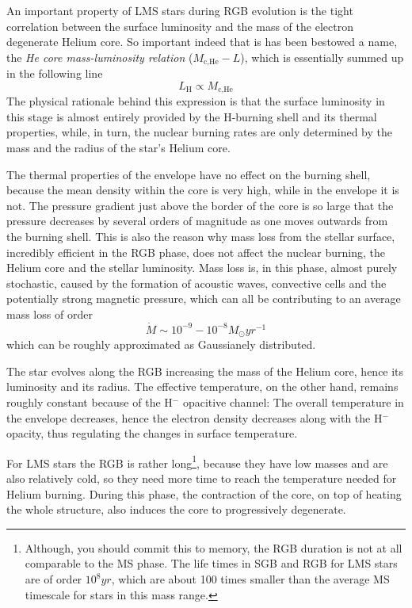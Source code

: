 \par An important property of LMS stars during RGB evolution is the tight correlation between the surface luminosity and the mass of the electron degenerate Helium core. So important indeed that is has been bestowed a name, the \emph{He core mass-luminosity relation} ($M_{\text{c,He}}-L$), which is essentially summed up in the following line 
\begin{equation}
    L_{\text{H}} \propto M_{\text{c,He}}
    \label{eq:coremass-luminosity relation}
\end{equation}
The physical rationale behind this expression is that the surface luminosity in this stage is almost entirely provided by the H-burning shell and its thermal properties, while, in turn, the nuclear burning rates are only determined by the mass and the radius of the star's Helium core.
\par The thermal properties of the envelope have no effect on the burning shell, because the mean density within the core is very high, while in the envelope it is not. The pressure gradient just above the border of the core is so large that the pressure decreases by several orders of magnitude as one moves outwards from the burning shell. This is also the reason why mass loss from the stellar surface, incredibly efficient in the RGB phase, does not affect the nuclear burning, the Helium core and the stellar luminosity. Mass loss is, in this phase, almost purely stochastic, caused by the formation of acoustic waves, convective cells and the potentially strong magnetic pressure, which can all be contributing to an average mass loss of order 
\begin{equation*}
    \dot{M} \sim 10^{-9}-10^{-8}M_{\odot}\unit{yr}^{-1}
\end{equation*}
which can be roughly approximated as Gaussianely distributed.
\par The star evolves along the RGB increasing the mass of the Helium core, hence its luminosity and its radius. The effective temperature, on the other hand, remains roughly constant because of the H$^{-}$ opacitive channel: The overall temperature in the envelope decreases, hence the electron density decreases along with the H$^{-}$ opacity, thus regulating the changes in surface temperature.
\par For LMS stars the RGB is rather long\footnote{Although, you should commit this to memory, the RGB duration is not at all comparable to the MS phase. The life times in SGB and RGB for LMS stars are of order $10^{8}\unit{yr}$, which are about 100 times smaller than the average MS timescale for stars in this mass range.}, because they have low masses and are also relatively cold, so they need more time to reach the temperature needed for Helium burning. During this phase, the contraction of the core, on top of heating the whole structure, also induces the core to progressively degenerate.
